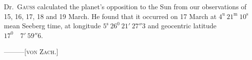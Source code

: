 Dr.\ \textsc{Gauss} calculated the planet’s opposition to the Sun from our observations of 15, 16, 17, 18 and 19 March. He found that it occurred on 17 March at $4^{\mathrm{u}}\ 21^{\mathrm{m}}\ 10^{\mathrm{s}}$ mean Seeberg time, at longitude $5^{\mathrm{s}}\ 26^0\ 21'\ 27''3$ and geocentric latitude $17^0\quad7'\ 59''6$.
\par\noindent —\quad —\quad —\hfill [\textsc{von Zach}.]\par

